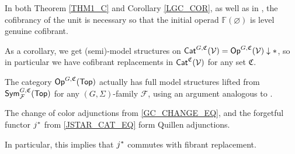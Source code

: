 \documentclass[a4paper,10pt
,draft
]{article}%
\renewcommand{\F}{\mathcal F}
\renewcommand{\1}{\eta}%
\begin{document}
In both Theorem \ref{THM1_C} and Corollary \ref{LGC_COR}, as well as in \cite{BP_geo},
the cofibrancy of the unit is necessary so that the initial operad $\mathbb F(\varnothing)$ is level genuine cofibrant.

\begin{remark}
      \label{CATV_MC_REM}
      As a corollary, we get (semi)-model structures on $\Cat^{G, \mathfrak C}(\V) = \Op^{G, \mathfrak C}(\V) \downarrow \**$,
      so in particular we have cofibrant replacements in $\mathsf{Cat}^{\mathfrak C}(\mathcal V)$ for any set $\mathfrak C$.
\end{remark}


\begin{remark}
      \label{TOP_FULL_REM}
      The category $\mathsf{Op}^{G,\mathfrak C}(\mathsf{Top})$ actually has full model structures lifted from $\Sym^{G, \mathfrak C}_\F(\Top)$
      for any $(G, \Sigma)$-family $\F$,
      using an argument analogous to \cite[Thm. 3.1]{GW}.
\end{remark}









\begin{corollary}
      \label{COLOR_CHANGE_Q_COR}
      The change of color adjunctions from \eqref{GC_CHANGE_EQ},
      and the forgetful functor $j^{\**}$ from \eqref{JSTAR_CAT_EQ}
      form Quillen adjunctions.
\end{corollary}

\begin{remark}
      In particular, this implies that $j^{\**}$ commutes with fibrant replacement.
\end{remark}





















\newpage
\end{document}
